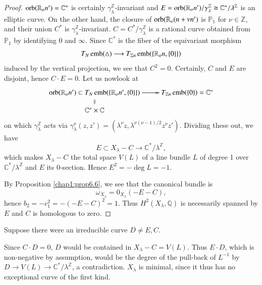 \begin{proof}
$\operatorname{orb} (\mathbb{R}_{o} n') = \mathbb{C}^{*}$ is certainly
  $\gamma^{\mathbb{Z}}_{\lambda}$-invariant and $E =
  \operatorname{orb}(\mathbb{R}_{o} n') / \gamma^{\mathbb{Z}}_{\lambda}  \cong
  \mathbb{C}^{*}/ \lambda^{\mathbb{Z}}$ is an elliptic curve. On the
  other hand, the closure of $\operatorname{orb} (\mathbb{R}_{o} (n + \nu n')$
 is $\mathbb{P}_{1}$ for $\nu \in \mathbb{Z}$, and
  their union $C^{*}$ is
  $\gamma^{\mathbb{Z}}_{\lambda}$-invariant. $C = C^{*}/
  \gamma^{\mathbb{Z}}_{\lambda}$ is a 
  rational curve obtained from $\mathbb{P}_{1}$ by identifying 0 and
  $\infty$. Since $\mathbb{C}^{*}$ is the fiber of the equivariant
  morphism 
$$
T_{N} \operatorname{emb} (\triangle) \longrightarrow  T_{\mathbb{Z}n} \operatorname{emb} 
(\{\mathbb{R}_{o}n, \{0\}\}) 
$$
induced by the vertical projection, we see that  $C^{2} = 0$. 
Certainly, $C$ and $E$ are disjoint, hence $C \cdot E = 0$. Let us
now\pageoriginale look at    
\[
\xymatrix@R=0.4cm{
\orb(\mathbb{R}_{o}n') \subset T_{N}\emb (\{\mathbb{R}_{o}n', \{0\}
\}) \ar[r]  \ar@{}[d]|{||}&  T_{\mathbb{Z}n} \emb (\{0\}) =
\mathbb{C}^{*}   \\ 
\mathbb{C}^\ast \times \mathbb{C}
}
\]
on which $\gamma^{\mathbb{Z}}_{\lambda}$ acts via
$\gamma^{\nu}_{\lambda} (z, z') = (\lambda^{\nu} z, \lambda^{\nu
  (\nu-1)/2} z^{\nu} z')$.  
Dividing these out, we have 
$$
E \subset X_{\lambda} - C \longrightarrow \mathbb{C}^{*}/
\lambda^{\mathbb{Z}},   
$$
which makes $X_{\lambda} - C$ the total space $V(L)$ of a line bundle
$L$ of degree 1 over $\mathbb{C}^{*} / \lambda^{\mathbb{Z}}$ and $E$
its 0-section. Hence $E^{2} = -\deg L = -1$. 

\noindent
By Proposition \ref{chap1:prop6.6}, we see that the canonical bundle is  
$$
\omega_{X_{\lambda}} = 0_{X_{\lambda}} (-E - C),  
$$
hence $b_{2} = -c^{2}_{1} = - (-E - C)^{2} = 1$. Thus $H^{2}
(X_{\lambda}, \mathbb{Q})$ is necessarily spanned by $E$ and $C$ is
homologous  to zero.  
\end{proof}

Suppose there were an irreducible curve $D \neq E, C$. 

\noindent
Since $C  \cdot D = 0$, $D$ would be contained in $X_{\lambda} - C =
V(L)$. Thus $E \cdot D$, which is non-negative by assumption, would be the
degree of the pull-back of $L^{-1}$ by $D \to V(L) \to \mathbb{C}^{*}
/ \lambda^{\mathbb{Z}}$, a contradiction. $X_{\lambda}$ is minimal,
since it thus has no exceptional curve of the first kind.  

